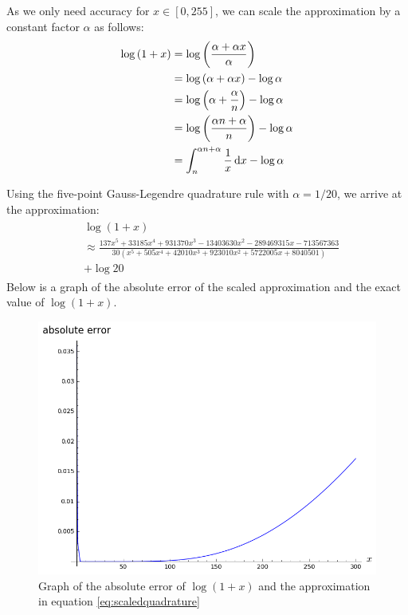As we only need accuracy for $x \in [0, 255]$, we can scale the approximation by a constant factor $\alpha$ as follows:
\begin{align*}
  \log{(1+x)} &= \log{\left(\frac{\alpha + \alpha x}{\alpha}\right)}\\
  &= \log{(\alpha + \alpha x)} - \log{\alpha}\\
  &= \log{\left(\alpha+\frac{\alpha}{n}\right)} - \log{\alpha}\\
  &= \log{\left(\frac{\alpha n + \alpha}{n}\right)} - \log{\alpha}\\
  &= \int_{n}^{\alpha n + \alpha}{\frac{1}{x}\mathop{}\!\mathrm{d} x} - \log{\alpha}
\end{align*}

Using the five-point Gauss-Legendre quadrature rule with $\alpha = 1/20$, we arrive at the approximation:
\begin{align}\label{eq:scaledquadrature}
  \begin{split}
    &\log(1+x) \\
    &\approx \frac{137x^5 + 33185x^4 + 931370x^3 - 13403630x^2 - 289469315x - 713567363}
    {30(x^5 + 505x^4 + 42010x^3 + 923010x^2 + 5722005x + 8040501)} \\
    &+ \log{20}
  \end{split}
\end{align}
Below is a graph of the absolute error of the scaled approximation and the exact value of $\log{(1+x)}$.
\begin{figure}[h]
    \centering
    \includegraphics[width=.9\linewidth]{figures/ModifiedQuadratureAbsoluteError.png}
    \caption{Graph of the absolute error of $\log{(1+x)}$ and the approximation in equation \ref{eq:scaledquadrature}}
    \label{fig:scaledquadrature}
\end{figure}

